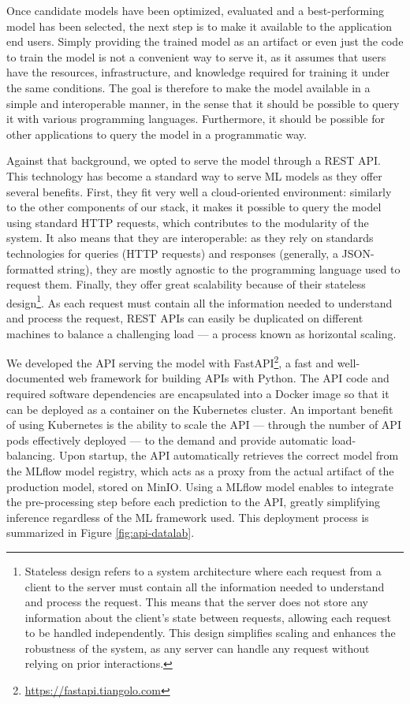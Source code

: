 \documentclass[graybox]{svmult}
\begin{document}
Once candidate models have been optimized, evaluated and a best-performing model has been selected, the next step is to make it available to the application end users. Simply providing the trained model as an artifact or even just the code to train the model is not a convenient way to serve it, as it assumes that users have the resources, infrastructure, and knowledge required for training it under the same conditions. The goal is therefore to make the model available in a simple and interoperable manner, in the sense that it should be possible to query it with various programming languages. Furthermore, it should be possible for other applications to query the model in a programmatic way. 

Against that background, we opted to serve the model through a REST API. This technology has become a standard way to serve ML models as they offer several benefits. First, they fit very well a cloud-oriented environment: similarly to the other components of our stack, it makes it possible to query the model using standard HTTP requests, which contributes to the modularity of the system. It also means that they are interoperable: as they rely on standards technologies for queries (HTTP requests) and responses (generally, a JSON-formatted string), they are mostly agnostic to the programming language used to request them. Finally, they offer great scalability because of their stateless design\footnote{Stateless design refers to a system architecture where each request from a client to the server must contain all the information needed to understand and process the request. This means that the server does not store any information about the client's state between requests, allowing each request to be handled independently. This design simplifies scaling and enhances the robustness of the system, as any server can handle any request without relying on prior interactions.}. As each request must contain all the information needed to understand and process the request, REST APIs can easily be duplicated on different machines to balance a challenging load — a process known as horizontal scaling.

We developed the API serving the model with FastAPI\footnote{\url{https://fastapi.tiangolo.com}}, a fast and well-documented web framework for building APIs with Python. The API code and required software dependencies are encapsulated into a Docker image so that it can be deployed as a container on the Kubernetes cluster. An important benefit of using Kubernetes is the ability to scale the API — through the number of API pods effectively deployed — to the demand and provide automatic load-balancing. Upon startup, the API automatically retrieves the correct model from the MLflow model registry, which acts as a proxy from the actual artifact of the production model, stored on MinIO. Using a MLflow model enables to integrate the pre-processing step before each prediction to the API, greatly simplifying inference regardless of the ML framework used. This deployment process is summarized in Figure \ref{fig:api-datalab}.
\end{document}
